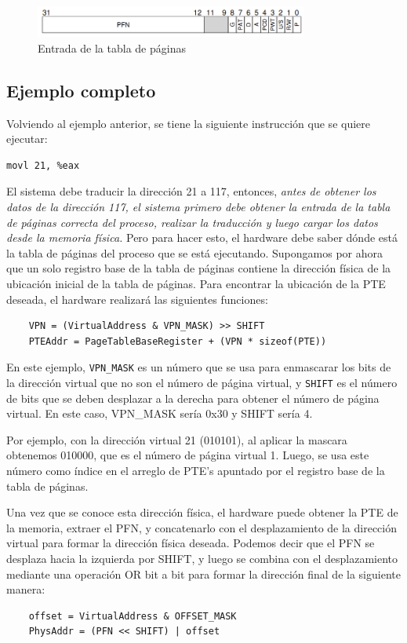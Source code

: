 \documentclass{article}
\begin{document}
\begin{figure}[h]
    \centering
    \includegraphics[width=0.8\textwidth]{src/pte.png}
    \caption{Entrada de la tabla de páginas}
\end{figure}

\subsection{Ejemplo completo}
Volviendo al ejemplo anterior, se tiene la siguiente instrucción que se quiere ejecutar:
\begin{verbatim}
movl 21, %eax
\end{verbatim}
El sistema debe traducir la dirección 21 a 117, entonces, \textit{antes de obtener los datos de la dirección 117, el sistema primero debe obtener la entrada de la tabla de páginas correcta del proceso, realizar la traducción y luego cargar los datos desde la memoria física.} Pero para hacer esto, el hardware debe saber dónde está la tabla de páginas del proceso que se está ejecutando. Supongamos por ahora que un solo registro base de la tabla de páginas contiene la dirección física de la ubicación inicial de la tabla de páginas. Para encontrar la ubicación de la PTE deseada, el hardware realizará las siguientes funciones:
\begin{verbatim}
    VPN = (VirtualAddress & VPN_MASK) >> SHIFT
    PTEAddr = PageTableBaseRegister + (VPN * sizeof(PTE))    
\end{verbatim}
En este ejemplo, \texttt{VPN\_MASK} es un número que se usa para enmascarar los bits de la dirección virtual que no son el número de página virtual, y \texttt{SHIFT} es el número de bits que se deben desplazar a la derecha para obtener el número de página virtual. En este caso, VPN\_MASK sería 0x30 y SHIFT sería 4.

Por ejemplo, con la dirección virtual 21 (010101), al aplicar la mascara obtenemos 010000, que es el número de página virtual 1. Luego, se usa este número como índice en el arreglo de PTE's apuntado por el registro base de la tabla de páginas.

Una vez que se conoce esta dirección física, el hardware puede obtener la PTE de la memoria, extraer el PFN, y concatenarlo con el desplazamiento de la dirección virtual para formar la dirección física deseada. Podemos decir que el PFN se desplaza hacia la izquierda por SHIFT, y luego se combina con el desplazamiento mediante una operación OR bit a bit para formar la dirección final de la siguiente manera:
\begin{verbatim}
    offset = VirtualAddress & OFFSET_MASK
    PhysAddr = (PFN << SHIFT) | offset    
\end{verbatim}
\end{document}
